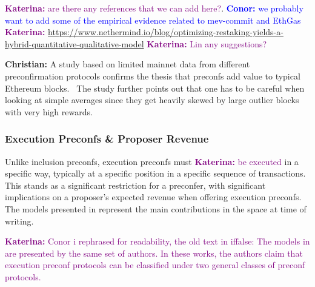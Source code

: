 \documentclass[a4paper]{article}
\theoremstyle{boldstyle}
\newcommand{\cm}[1]{\textcolor{blue}{\textbf{Conor:} #1}}
\newcommand{\ks}[1]{\textcolor{purple}{\textbf{Katerina:} #1}}
\newcommand{\chm}[1]{\textcolor{OliveGreen}{\textbf{Christian:} #1}}
\begin{document}
     \ks{are there any references that we can add here?}. 
     \cm{we probably want to add some of the empirical evidence related to mev-commit and EthGas}
     \ks{\url{https://www.nethermind.io/blog/optimizing-restaking-yields-a-hybrid-quantitative-qualitative-model}} \ks{Lin any suggestions?}
    
     \chm{A study based on limited mainnet data from different preconfirmation protocols confirms the thesis that preconfs add value to typical Ethereum blocks.~\cite{W:MeasuringValidatorEconomics} The study further points out that one has to be careful when looking at simple averages since they get heavily skewed by large outlier blocks with very high rewards.}
    
    \subsubsection{Execution Preconfs \& Proposer Revenue}\label{sec:execpreconfproposerrevenue}
    Unlike inclusion preconfs, execution preconfs must \ks{ be executed} in a specific way, typically at a specific position in a specific sequence of transactions. This stands as a significant restriction for a preconfer, with significant implications on a proposer's expected revenue when offering execution preconfs. The models presented in \cite{W:EstimatingtheRevenuefromIndependentSub-SlotAuctionPreconfirmations, W:AnalysingExpectedProposerRevenuefromPreconfirmations, W:PreconfirmationsundertheNOlens} represent the main contributions in the space at time of writing. 
    
    \ks{Conor i rephrased for readability, the old text in iffalse: The models in \cite{W:EstimatingtheRevenuefromIndependentSub-SlotAuctionPreconfirmations, W:AnalysingExpectedProposerRevenuefromPreconfirmations} are presented by the same set of authors. In these works, the authors claim that execution preconf protocols can be classified under two general classes of preconf protocols.  }
    
\end{document}
